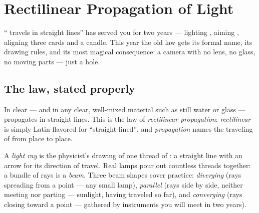 \chapter{Rectilinear Propagation of Light}\label{ch:g6:light-propagation}

`` travels in straight lines'' has served you for two years
--- lighting , aiming , aligning three cards and a
candle. This year the old law gets its formal name, its drawing
rules, and its most magical consequence: a camera with no lens, no
glass, no moving parts --- just a hole.

\section{The law, stated properly}

\begin{proposition}\label{prop:g6:light-propagation:law}
In clear  --- and in any clear, well-mixed material such as
still water or glass ---  propagates in straight lines. This
is the law of \emph{rectilinear propagation}: \emph{rectilinear} is simply Latin-flavored for
``straight-lined'', and \emph{propagation} names the traveling of
 from place to place.
\end{proposition}

\begin{definition}\label{def:g6:light-propagation:ray}
A \emph{light ray} is the physicist's drawing of
one thread of : a straight line with an arrow for its
direction of travel. Real lamps pour out countless threads
together: a bundle of rays is a \emph{beam}. Three
beam shapes cover practice: \emph{diverging} (rays spreading from
a point --- any small lamp), \emph{parallel} (rays side by side,
neither meeting nor parting --- sunlight, having traveled so far),
and \emph{converging} (rays closing toward a point --- 
gathered by instruments you will meet in two years).
\end{definition}

